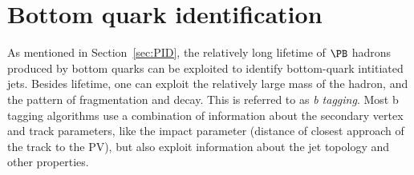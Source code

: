 


\section{Bottom quark identification} \label{sec:btagging}



As mentioned in Section~\ref{sec:PID}, the relatively long lifetime of $\PB$ hadrons produced by bottom quarks can be exploited to identify bottom-quark intitiated jets.
Besides lifetime, one can exploit the relatively large mass of the {\PB} hadron, and the pattern of fragmentation and decay. This is referred to as \emph{b tagging}.
Most b tagging algorithms use a combination of information about the secondary vertex and track parameters, like the impact parameter (distance of closest approach of the track to the PV), but also exploit information about the jet topology and other properties.


